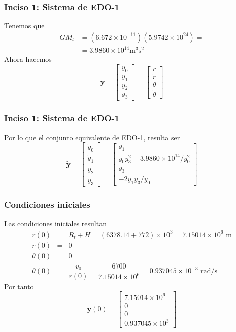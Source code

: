 \begin{frame}
\frametitle{Inciso 1: Sistema de EDO-1}
Tenemos que
\[ \begin{split} G M_{t} &= (6.672 \times 10^{-11}) (5.9742 \times 10^{24})  = \\
 &= 3.9860 \times 10^{14} \mbox{m}^{3} \mbox{s}^{2} \end{split} \]
Ahora hacemos
\[ \mathbf{y} = \begin{bmatrix}
y_{0} \\
y_{1} \\
y_{2} \\
y_{3}
\end{bmatrix} =
\begin{bmatrix}
r \\
\dot{r} \\
\theta \\
\dot{\theta}
\end{bmatrix}
\]
\end{frame}
\begin{frame}
\frametitle{Inciso 1: Sistema de EDO-1}
Por lo que el conjunto equivalente de EDO-1, resulta ser
\[ \dot{\mathbf{y}} = \begin{bmatrix}
\dot{y}_{0} \\
\dot{y}_{1} \\
\dot{y}_{2} \\
\dot{y}_{3}
\end{bmatrix} =
\begin{bmatrix}
y_{1} \\
y_{0} y_{3}^{2} - 3.9860 \times 10^{14}/y_{0}^{2} \\
y_{3} \\
-2 y_{1} y_{3} / y_{0}
\end{bmatrix} \]
\end{frame}
\begin{frame}
\frametitle{Condiciones iniciales}
Las condiciones iniciales resultan
\fontsize{12}{12}\selectfont
\begin{eqnarray*}
r(0) &=& R_{t} + H = (6378.14+772) \times 10^{3} = 7.15014 \times 10^{6} \mbox{ m} \\
\dot{r}(0) &=& 0 \\
\theta(0) &=& 0 \\
\dot{\theta}(0) &=& \dfrac{v_{0}}{r(0)} = \dfrac{6700}{7.15014 \times 10^{6}} = 0.937045 \times 10^{-3} \mbox{ rad/s}
\end{eqnarray*}
\fontsize{14}{14}\selectfont
\pause
Por tanto
\[ \mathbf{y}(0) = 
\begin{bmatrix}
7.15014 \times 10^{6} \\
0 \\
0 \\
0.937045 \times 10^{3}
\end{bmatrix}
\]
\end{frame}
